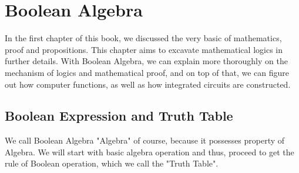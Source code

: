 \chapterspaceabove{6.75cm} 
\chapterspacebelow{7.25cm} 
\chapter{Boolean Algebra}
    In the first chapter of this book, we discussed the very basic of mathematics, 
    proof and propositions. This chapter aims to excavate mathematical logics in 
    further details. With Boolean Algebra, we can explain more thoroughly on
    the mechanism of logics and mathematical proof, and on top of that, we can 
    figure out how computer functions, as well as how integrated circuits are 
    constructed.
    \section{Boolean Expression and Truth Table}
        We call Boolean Algebra "Algebra" of course, because it possesses property of Algebra.
        We will start with basic algebra operation and thus, proceed to get the rule of 
        Boolean operation, which we call the "Truth Table".
